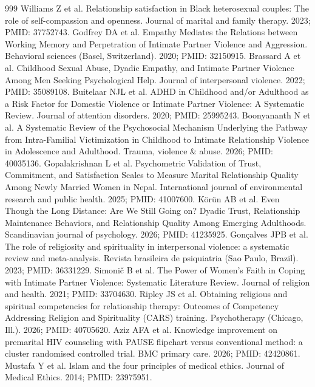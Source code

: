 \documentclass[11pt]{article}
\begin{document}
\begin{thebibliography}{999}
 Williams Z et al. Relationship satisfaction in Black heterosexual couples: The role of self-compassion and openness. Journal of marital and family therapy. 2023; PMID: 37752743.
 Godfrey DA et al. Empathy Mediates the Relations between Working Memory and Perpetration of Intimate Partner Violence and Aggression. Behavioral sciences (Basel, Switzerland). 2020; PMID: 32150915.
 Brassard A et al. Childhood Sexual Abuse, Dyadic Empathy, and Intimate Partner Violence Among Men Seeking Psychological Help. Journal of interpersonal violence. 2022; PMID: 35089108.
 Buitelaar NJL et al. ADHD in Childhood and/or Adulthood as a Risk Factor for Domestic Violence or Intimate Partner Violence: A Systematic Review. Journal of attention disorders. 2020; PMID: 25995243.
 Boonyananth N et al. A Systematic Review of the Psychosocial Mechanism Underlying the Pathway from Intra-Familial Victimization in Childhood to Intimate Relationship Violence in Adolescence and Adulthood. Trauma, violence \& abuse. 2026; PMID: 40035136.
 Gopalakrishnan L et al. Psychometric Validation of Trust, Commitment, and Satisfaction Scales to Measure Marital Relationship Quality Among Newly Married Women in Nepal. International journal of environmental research and public health. 2025; PMID: 41007600.
 Körün AB et al. Even Though the Long Distance: Are We Still Going on? Dyadic Trust, Relationship Maintenance Behaviors, and Relationship Quality Among Emerging Adulthoods. Scandinavian journal of psychology. 2026; PMID: 41235925.
 Gonçalves JPB et al. The role of religiosity and spirituality in interpersonal violence: a systematic review and meta-analysis. Revista brasileira de psiquiatria (Sao Paulo, Brazil). 2023; PMID: 36331229.
 Simonič B et al. The Power of Women's Faith in Coping with Intimate Partner Violence: Systematic Literature Review. Journal of religion and health. 2021; PMID: 33704630.
 Ripley JS et al. Obtaining religious and spiritual competencies for relationship therapy: Outcomes of Competency Addressing Religion and Spirituality (CARS) training. Psychotherapy (Chicago, Ill.). 2026; PMID: 40705620.
 Aziz AFA et al. Knowledge improvement on premarital HIV counseling with PAUSE flipchart versus conventional method: a cluster randomised controlled trial. BMC primary care. 2026; PMID: 42420861.
 Mustafa Y et al. Islam and the four principles of medical ethics. Journal of Medical Ethics. 2014; PMID: 23975951.

\end{thebibliography}
\end{document}
